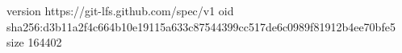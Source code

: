 version https://git-lfs.github.com/spec/v1
oid sha256:d3b11a2f4c664b10e19115a633c87544399cc517de6c0989f81912b4ee70bfe5
size 164402
